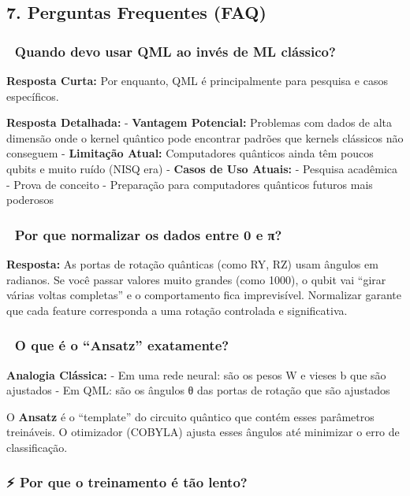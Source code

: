 \documentclass[
  brazilian,
]{report}
\begin{document}
\subsection{7. Perguntas Frequentes
(FAQ)}\label{perguntas-frequentes-faq}

\subsubsection{🤔 Quando devo usar QML ao invés de ML
clássico?}\label{quando-devo-usar-qml-ao-invuxe9s-de-ml-cluxe1ssico}

\textbf{Resposta Curta:} Por enquanto, QML é principalmente para
pesquisa e casos específicos.

\textbf{Resposta Detalhada:} - \textbf{Vantagem Potencial:} Problemas
com dados de alta dimensão onde o kernel quântico pode encontrar padrões
que kernels clássicos não conseguem - \textbf{Limitação Atual:}
Computadores quânticos ainda têm poucos qubits e muito ruído (NISQ era)
- \textbf{Casos de Uso Atuais:} - Pesquisa acadêmica - Prova de conceito
- Preparação para computadores quânticos futuros mais poderosos

\subsubsection{🧮 Por que normalizar os dados entre 0 e
π?}\label{por-que-normalizar-os-dados-entre-0-e-ux3c0}

\textbf{Resposta:} As portas de rotação quânticas (como RY, RZ) usam
ângulos em radianos. Se você passar valores muito grandes (como 1000), o
qubit vai ``girar várias voltas completas'' e o comportamento fica
imprevisível. Normalizar garante que cada feature corresponda a uma
rotação controlada e significativa.

\subsubsection{🔄 O que é o ``Ansatz''
exatamente?}\label{o-que-uxe9-o-ansatz-exatamente}

\textbf{Analogia Clássica:} - Em uma rede neural: são os pesos W e
vieses b que são ajustados - Em QML: são os ângulos θ das portas de
rotação que são ajustados

O \textbf{Ansatz} é o ``template'' do circuito quântico que contém esses
parâmetros treináveis. O otimizador (COBYLA) ajusta esses ângulos até
minimizar o erro de classificação.

\subsubsection{⚡ Por que o treinamento é tão
lento?}\label{por-que-o-treinamento-uxe9-tuxe3o-lento}
\end{document}
